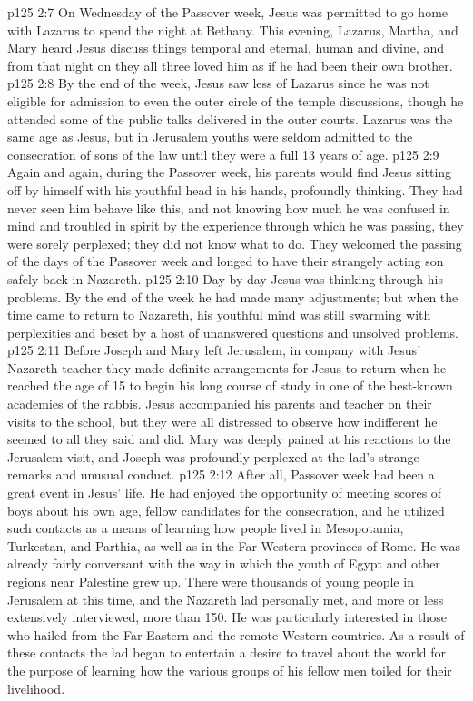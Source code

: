 \vs p125 2:7 On Wednesday of the Passover week, Jesus was permitted to go home with Lazarus to spend the night at Bethany. This evening, Lazarus, Martha, and Mary heard Jesus discuss things temporal and eternal, human and divine, and from that night on they all three loved him as if he had been their own brother.
\vs p125 2:8 By the end of the week, Jesus saw less of Lazarus since he was not eligible for admission to even the outer circle of the temple discussions, though he attended some of the public talks delivered in the outer courts. Lazarus was the same age as Jesus, but in Jerusalem youths were seldom admitted to the consecration of sons of the law until they were a full 13 years of age.
\vs p125 2:9 Again and again, during the Passover week, his parents would find Jesus sitting off by himself with his youthful head in his hands, profoundly thinking. They had never seen him behave like this, and not knowing how much he was confused in mind and troubled in spirit by the experience through which he was passing, they were sorely perplexed; they did not know what to do. They welcomed the passing of the days of the Passover week and longed to have their strangely acting son safely back in Nazareth.
\vs p125 2:10 Day by day Jesus was thinking through his problems. By the end of the week he had made many adjustments; but when the time came to return to Nazareth, his youthful mind was still swarming with perplexities and beset by a host of unanswered questions and unsolved problems.
\vs p125 2:11 Before Joseph and Mary left Jerusalem, in company with Jesus’ Nazareth teacher they made definite arrangements for Jesus to return when he reached the age of 15 to begin his long course of study in one of the best\hyp{}known academies of the rabbis. Jesus accompanied his parents and teacher on their visits to the school, but they were all distressed to observe how indifferent he seemed to all they said and did. Mary was deeply pained at his reactions to the Jerusalem visit, and Joseph was profoundly perplexed at the lad’s strange remarks and unusual conduct.
\vs p125 2:12 After all, Passover week had been a great event in Jesus’ life. He had enjoyed the opportunity of meeting scores of boys about his own age, fellow candidates for the consecration, and he utilized such contacts as a means of learning how people lived in Mesopotamia, Turkestan, and Parthia, as well as in the Far\hyp{}Western provinces of Rome. He was already fairly conversant with the way in which the youth of Egypt and other regions near Palestine grew up. There were thousands of young people in Jerusalem at this time, and the Nazareth lad personally met, and more or less extensively interviewed, more than 150. He was particularly interested in those who hailed from the Far\hyp{}Eastern and the remote Western countries. As a result of these contacts the lad began to entertain a desire to travel about the world for the purpose of learning how the various groups of his fellow men toiled for their livelihood.
